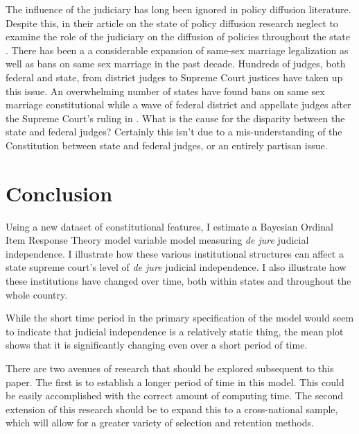 \documentclass[12pt]{article}
\begin{document}
The influence of the judiciary has long been ignored in policy diffusion literature.  Despite this, in their article on the state of policy diffusion research \citeauthor{graham2013diffusion} neglect to examine the role of the judiciary on the diffusion of policies throughout the state \citep{graham2013diffusion}.  There has been a a considerable expansion of same-sex marriage legalization as well as bans on same sex marriage in the past decade.  Hundreds of judges, both federal and state, from district judges to Supreme Court justices have taken up this issue.  An overwhelming number of states have found bans on same sex marriage constitutional while a wave of federal district and appellate judges after the Supreme Court's ruling in \cite{windsor}.  What is the cause for the disparity between the state and federal judges? Certainly this isn't due to a mis-understanding of the Constitution between state and federal judges, or an entirely partisan issue.   


\section{Conclusion}
Using a new dataset of constitutional features, I estimate a Bayesian Ordinal Item Response Theory model variable model measuring \textit{de jure} judicial independence.  I illustrate how these various institutional structures can affect a state supreme court's level of \textit{de jure} judicial independence.  I also illustrate how these institutions have changed over time, both within states and throughout the whole country.  

While the short time period in the primary specification of the model would seem to indicate that judicial independence is a relatively static thing, the mean plot shows that it is significantly changing even over a short period of time. 

There are two avenues of research that should be explored subsequent to this paper.  The first is to establish a longer period of time in this model.  This could be easily accomplished with the correct amount of computing time.  The second extension of this research should be to expand this to a cross-national sample, which will allow for a greater variety of selection and retention methods.

\newpage
\singlespacing



\appendix
\end{document}
